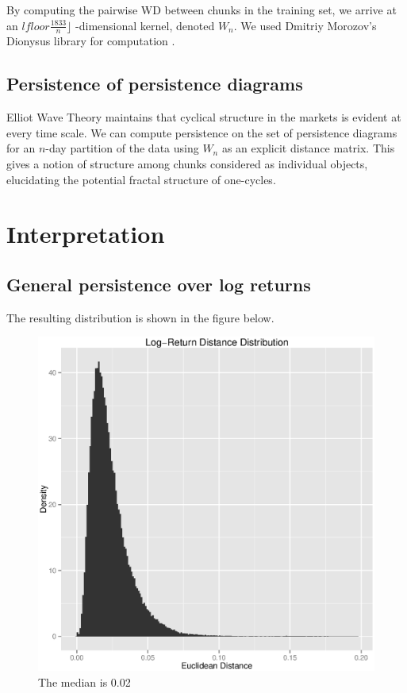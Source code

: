 \documentclass{article}
\begin{document}
By computing the pairwise WD between chunks in the training set, we arrive at an $lfloor \frac{1833}{n} \rfloor$ -dimensional kernel, denoted $W_n$. We used Dmitriy Morozov’s Dionysus library for computation \cite{morozov2012}.

\subsection{Persistence of persistence diagrams}
Elliot Wave Theory maintains that cyclical structure in the markets is evident at every time scale. We can compute persistence on the set of persistence diagrams for an $n$-day partition of the data using $W_n$ as an explicit distance matrix. This gives a notion of structure among chunks considered as individual objects, elucidating the potential fractal structure of one-cycles.


\section{Interpretation}

\subsection{General persistence over log returns}
The resulting distribution is shown in the figure below. 
\begin{figure}
\begin{center}
\includegraphics[width = 3.5 in, height = 3.5 in]{globplots/lr-dist}
\caption{The median is 0.02}
\label{lrdist}
\end{center}
\end{figure}
\end{document}
